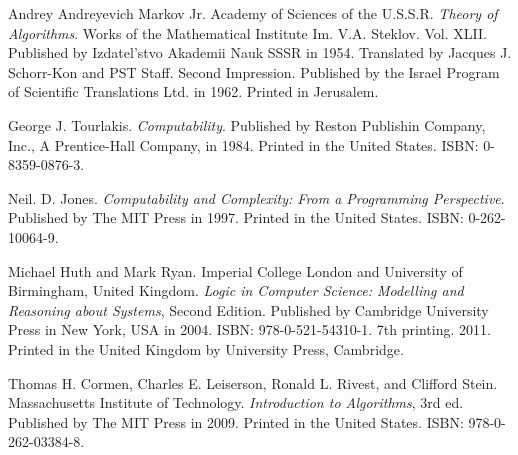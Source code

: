 \begin{thebibliography}{9}
\backrefprint


Andrey Andreyevich Markov Jr. Academy of Sciences of the U.S.S.R. \emph{Theory
of Algorithms}. Works of the Mathematical Institute Im. V.A. Steklov. Vol.
XLII. Published by Izdatel'stvo Akademii Nauk SSSR in 1954. Translated by
Jacques J. Schorr-Kon and PST Staff. Second Impression. Published by the Israel
Program of Scientific Translations Ltd. in 1962. Printed in Jerusalem.

\backrefprint


George J. Tourlakis. \emph{Computability}. Published by Reston Publishin
Company, Inc., A Prentice-Hall Company, in 1984. Printed in the United States.
ISBN: 0-8359-0876-3.

\backrefprint


Neil. D. Jones. \emph{Computability and Complexity: From a Programming
Perspective}. Published by The MIT Press in 1997.  Printed in the United
States. ISBN: 0-262-10064-9.

\backrefprint





Michael Huth and Mark Ryan. Imperial College London and University of
Birmingham, United Kingdom. \emph{Logic in Computer Science: Modelling and
Reasoning about Systems}, Second Edition. Published by Cambridge University
Press in New York, USA in 2004. ISBN: 978-0-521-54310-1. 7th printing.  2011.
Printed in the United Kingdom by University Press, Cambridge.

\backrefprint


Thomas H. Cormen, Charles E. Leiserson, Ronald L. Rivest, and Clifford Stein.
Massachusetts Institute of Technology.  \emph{Introduction to Algorithms}, 3rd
ed. Published by The MIT Press in 2009. Printed in the United States. ISBN:
978-0-262-03384-8.


\end{thebibliography}
